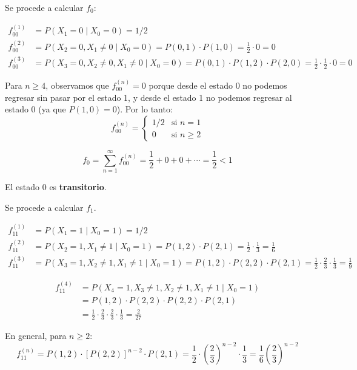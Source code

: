 \documentclass[12pt,a4paper]{article}
\begin{document}
Se procede a calcular $f_0$:

\begin{align*}
f_{00}^{(1)} &= P(X_1=0 \mid X_0=0) = 1/2 \\
f_{00}^{(2)} &= P(X_2=0, X_1 \neq 0 \mid X_0=0) = P(0,1) \cdot P(1,0) = \frac{1}{2} \cdot 0 = 0 \\
f_{00}^{(3)} &= P(X_3=0, X_2 \neq 0, X_1 \neq 0 \mid X_0=0) = P(0,1) \cdot P(1,2) \cdot P(2,0) = \frac{1}{2} \cdot \frac{1}{2} \cdot 0 = 0
\end{align*}

Para $n \geq 4$, observamos que $f_{00}^{(n)} = 0$ porque desde el estado 0 no podemos regresar sin pasar por el estado 1, y desde el estado 1 no podemos regresar al estado 0 (ya que $P(1,0) = 0$). Por lo tanto:
\begin{equation*}
f_{00}^{(n)} = \begin{cases}
1/2 & \text{si } n = 1 \\
0 & \text{si } n \geq 2
\end{cases}
\end{equation*}

\begin{equation*}
f_0 = \sum_{n=1}^{\infty} f_{00}^{(n)} = \frac{1}{2} + 0 + 0 + \cdots = \frac{1}{2} < 1
\end{equation*}

El estado $0$ es \textbf{transitorio}.

Se procede a calcular $f_1$.


\begin{align*}
f_{11}^{(1)} &= P(X_1=1 \mid X_0=1) = 1/2 \\
f_{11}^{(2)} &= P(X_2=1, X_1 \neq 1 \mid X_0=1) = P(1,2) \cdot P(2,1) = \frac{1}{2} \cdot \frac{1}{3} = \frac{1}{6} \\
f_{11}^{(3)} &= P(X_3=1, X_2 \neq 1, X_1 \neq 1 \mid X_0=1) = P(1,2) \cdot P(2,2) \cdot P(2,1) = \frac{1}{2} \cdot \frac{2}{3} \cdot \frac{1}{3} = \frac{1}{9}
\end{align*}

\begin{align*}
f_{11}^{(4)} &= P(X_4=1, X_3 \neq 1, X_2 \neq 1, X_1 \neq 1 \mid X_0=1) \\
&= P(1,2) \cdot P(2,2) \cdot P(2,2) \cdot P(2,1) \\
&= \frac{1}{2} \cdot \frac{2}{3} \cdot \frac{2}{3} \cdot \frac{1}{3} = \frac{2}{27}
\end{align*}

En general, para $n \geq 2$:
\begin{equation*}
f_{11}^{(n)} = P(1,2) \cdot [P(2,2)]^{n-2} \cdot P(2,1) = \frac{1}{2} \cdot \left(\frac{2}{3}\right)^{n-2} \cdot \frac{1}{3} = \frac{1}{6} \left(\frac{2}{3}\right)^{n-2}
\end{equation*}
\end{document}
